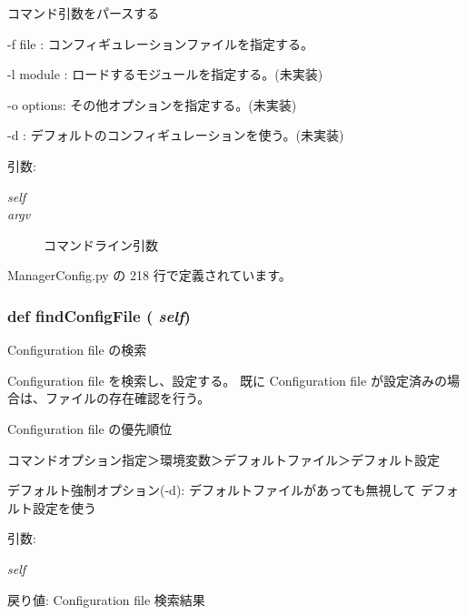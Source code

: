 コマンド引数をパースする 

-f file : コンフィギュレーションファイルを指定する。\par
 -l module : ロードするモジュールを指定する。(未実装)\par
 -o options: その他オプションを指定する。(未実装)\par
 -d : デフォルトのコンフィギュレーションを使う。(未実装)\par


\begin{Desc}
\item[引数:]
\begin{description}
\item[{\em self}]\item[{\em argv}]コマンドライン引数 \end{description}
\end{Desc}


 ManagerConfig.py の 218 行で定義されています。
\subsubsection{\setlength{\rightskip}{0pt plus 5cm}def findConfigFile ( {\em self})}\label{classsource__py_1_1_manager_config_1_1_manager_config_9aebe2d2b731e958c8b72e10eff3b8ab}


Configuration file の検索 

Configuration file を検索し、設定する。 既に Configuration file が設定済みの場合は、ファイルの存在確認を行う。

Configuration file の優先順位\par
 コマンドオプション指定＞環境変数＞デフォルトファイル＞デフォルト設定

デフォルト強制オプション(-d): デフォルトファイルがあっても無視して デフォルト設定を使う

\begin{Desc}
\item[引数:]
\begin{description}
\item[{\em self}]\end{description}
\end{Desc}
\begin{Desc}
\item[戻り値:]Configuration file 検索結果 \end{Desc}


